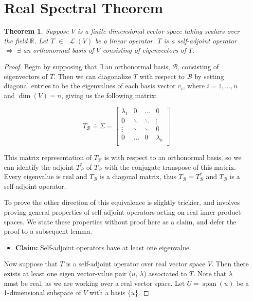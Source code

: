 \documentclass[letterpaper,12pt]{article}
\newtheorem{theorem}{Theorem}[section]
\begin{document}
\section{Real Spectral Theorem}
\begin{theorem}
Suppose $V$ is a finite-dimensional vector space taking scalars over the field 
$\mathbb{R}$. Let $T$ $\in$ $\operatorname{\mathcal{L}}(V)$ be a linear operator. $T$ is a self-adjoint operator $\Longleftrightarrow$ $\exists$ an orthonormal basis of $V$ consisting of eigenvectors of $T$.
\end{theorem}

\begin{proof}
Begin by supposing that $\exists$ an orthonormal basis, $\mathcal{B}$, consisting of eigenvectors of $T$. Then we can diagonalize $T$ with respect to $\mathcal{B}$ by setting diagonal entries to be the eigenvalues of each basis vector $v_i$, where $i = 1, ..., n$ and $\operatorname{dim}(V) = n$, giving us the following matrix:

\[
T_{\mathcal{B}} \doteq \Sigma =\begin{bmatrix}
    \lambda_{1} & 0 & \dots & 0 \\
    0 & \ddots & \ddots & \vdots \\
    \vdots & \ddots & \ddots & 0 \\
    0 & \dots & 0 & \lambda_{n}\\
    \end{bmatrix}
\]

This matrix representation of $T_{\mathcal{B}}$ is with respect to an orthonormal basis, so we can identify the adjoint $T_{\mathcal{B}}^{*}$ of $T_{\mathcal{B}}$ with the conjugate transpose of this matrix. Every eigenvalue is real and $T_{\mathcal{B}}$ is a diagonal matrix, thus $T_{\mathcal{B}} = T_{\mathcal{B}}^{*}$ and $T_{\mathcal{B}}$ is a self-adjoint operator.

To prove the other direction of this equivalence is slightly trickier, and involves proving general properties of self-adjoint operators acting on real inner product spaces. We state these properties without proof here as a claim, and defer the proof to a subsequent lemma.

\theoremstyle{remark}
\begin{itemize}
\item \textbf{Claim:} Self-adjoint operators have at least one eigenvalue.
\end{itemize}

Now suppose that $T$ is a self-adjoint operator over real vector space $V$. Then there exists at least one eigen vector-value pair ($u$, $\lambda$) associated to $T$. Note that $\lambda$ must be real, as we are working over a real vector space. Let $U = \operatorname{span}(u)$ be a 1-dimensional subspace of $V$ with a basis \{$u$\}.


\end{proof}
\end{document}
